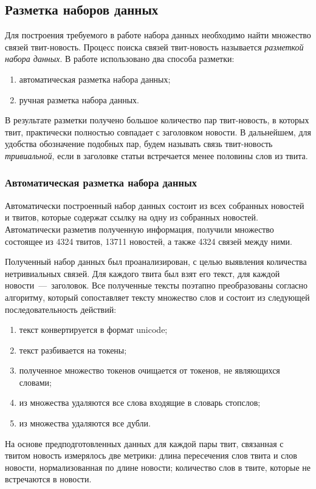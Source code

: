 \subsection{Разметка наборов данных}
    Для построения требуемого в работе набора данных необходимо найти множество связей твит-новость.
    Процесс поиска связей твит-новость называется \textit{разметкой набора данных}. В работе использовано два способа разметки:
    \begin{enumerate}
        \item автоматическая разметка набора данных;
        \item ручная разметка набора данных.
    \end{enumerate}

    В результате разметки получено большое количество пар твит-новость, в которых твит, практически полностью совпадает с заголовком новости.
    В дальнейшем, для удобства обозначение подобных пар, будем называть связь твит-новость \textit{тривиальной}, если в заголовке статьи встречается менее половины слов из твита.

    \subsubsection{Автоматическая разметка набора данных}
        Автоматически построенный набор данных состоит из всех собранных новостей и твитов, которые содержат ссылку на одну из собранных новостей.
        Автоматически разметив полученную информация, получили множество состоящее из 4324 твитов, 13711 новостей, а также 4324 связей между ними.

        Полученный набор данных был проанализирован, с целью выявления количества нетривиальных связей.
        Для каждого твита был взят его текст, для каждой новости~---~заголовок.
        Все полученные тексты поэтапно преобразованы согласно алгоритму, который сопоставляет тексту множество слов и состоит из следующей последовательность действий:
        \begin{enumerate}
            \item текст конвертируется в формат unicode;
            \item текст разбивается на токены;
            \item полученное множество токенов очищается от токенов, не являющихся словами;
            \item из множества удаляются все слова входящие в словарь стопслов;
            \item из множества удаляются все дубли.
        \end{enumerate}
        На основе предподготовленных данных для каждой пары твит, связанная с твитом новость измерялось две метрики:
        длина пересечения слов твита и слов новости, нормализованная по длине новости;
        количество слов в твите, которые не встречаются в новости.


